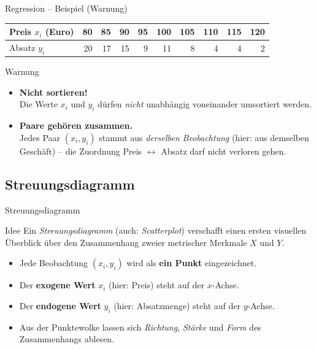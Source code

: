 \documentclass[aspectratio=169,11pt]{beamer}
\begin{document}
\begin{frame}{Regression -- Beispiel (Warnung)}
  \begin{center}
    \begin{tabular}{lrrrrrrrrr}
      \toprule
      Preis $x_i$ (Euro) & 80 & 85 & 90 & 95 & 100 & 105 & 110 & 115 & 120 \\
      \midrule
      Absatz $y_i$       & 20 & 17 & 15 & 9  & 11  & 8   & 4   & 4   & 2   \\
      \bottomrule
    \end{tabular}
  \end{center}

  \medskip

  \begin{alertblock}{Warnung}
    \begin{itemize}
      \item \textbf{Nicht sortieren!}\\
            Die Werte $x_i$ und $y_i$ dürfen \emph{nicht} unabhängig
            voneinander umsortiert werden.
      \item \textbf{Paare gehören zusammen.}\\
            Jedes Paar $(x_i, y_i)$ stammt aus \emph{derselben Beobachtung}
            (hier: aus demselben Geschäft) -- die Zuordnung
            Preis $\leftrightarrow$ Absatz darf nicht verloren gehen.
    \end{itemize}
  \end{alertblock}
\end{frame}

\subsection{Streuungsdiagramm}


\begin{frame}{Streuungsdiagramm}
  \begin{block}{Idee}
    Ein \emph{Streuungsdiagramm} (auch: \emph{Scatterplot}) verschafft
    einen ersten visuellen Überblick über den Zusammenhang zweier
    metrischer Merkmale $X$ und $Y$.
  \end{block}

  \medskip

  \begin{itemize}
    \item Jede Beobachtung $(x_i, y_i)$ wird als \textbf{ein Punkt}
          eingezeichnet.
    \item Der \textbf{exogene Wert} $x_i$ (hier: Preis) steht auf der
          $x$-Achse.
    \item Der \textbf{endogene Wert} $y_i$ (hier: Absatzmenge) steht auf
          der $y$-Achse.
    \item Aus der Punktewolke lassen sich \emph{Richtung}, \emph{Stärke}
          und \emph{Form} des Zusammenhangs ablesen.
  \end{itemize}
\end{frame}
\end{document}
